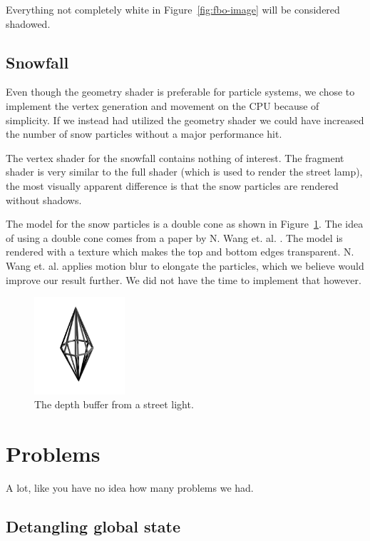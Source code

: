 \documentclass[a4paper,12pt]{article}
\begin{document}
Everything not completely white in Figure~\ref{fig:fbo-image} will be considered shadowed.

\subsection{Snowfall}
Even though the geometry shader is preferable for particle systems, we chose to implement the vertex generation and movement on the CPU because of simplicity. If we instead had utilized the geometry shader we could have increased the number of snow particles without a major performance hit.

The vertex shader for the snowfall contains nothing of interest. The fragment shader is very similar to the full shader (which is used to render the street lamp), the most visually apparent difference is that the snow particles are rendered without shadows.

The model for the snow particles is a double cone as shown in Figure~\ref{fig:dcone-image}. The idea of using a double cone comes from a paper by N. Wang et. al. \cite{snow-rain}. The model is rendered with a texture which makes the top and bottom edges transparent. N. Wang et. al. applies motion blur to elongate the particles, which we believe would improve our result further. We did not have the time to implement that however.
\begin{figure}[H]
  \centering
  \includegraphics[width=0.3\textwidth]{dcone}
  \caption{\label{fig:dcone-image} The depth buffer from a street light.}
\end{figure}


\section{Problems}

A lot, like you have no idea how many problems we had.

\subsection{Detangling global state}
\end{document}
